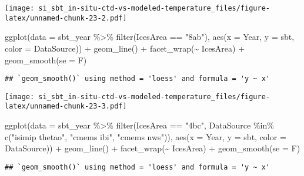 \documentclass[
]{article}
\newenvironment{Shaded}{\begin{snugshade}}{\end{snugshade}}
\newcommand{\AttributeTok}[1]{\textcolor[rgb]{0.77,0.63,0.00}{#1}}
\newcommand{\FunctionTok}[1]{\textcolor[rgb]{0.00,0.00,0.00}{#1}}
\newcommand{\NormalTok}[1]{#1}
\newcommand{\SpecialCharTok}[1]{\textcolor[rgb]{0.00,0.00,0.00}{#1}}
\newcommand{\StringTok}[1]{\textcolor[rgb]{0.31,0.60,0.02}{#1}}
\begin{document}
\texttt{[image: si\_sbt\_in-situ-ctd-vs-modeled-temperature\_files/figure-latex/unnamed-chunk-23-2.pdf]}

\begin{Shaded}
\begin{Highlighting}[]
\FunctionTok{ggplot}\NormalTok{(}\AttributeTok{data =}\NormalTok{ sbt\_year }\SpecialCharTok{\%\textgreater{}\%} \FunctionTok{filter}\NormalTok{(IcesArea }\SpecialCharTok{==} \StringTok{"8ab"}\NormalTok{), }\FunctionTok{aes}\NormalTok{(}\AttributeTok{x =}\NormalTok{ Year, }\AttributeTok{y =}\NormalTok{ sbt, }\AttributeTok{color =}\NormalTok{ DataSource)) }\SpecialCharTok{+} \FunctionTok{geom\_line}\NormalTok{() }\SpecialCharTok{+} \FunctionTok{facet\_wrap}\NormalTok{(}\SpecialCharTok{\textasciitilde{}}\NormalTok{ IcesArea) }\SpecialCharTok{+} \FunctionTok{geom\_smooth}\NormalTok{(}\AttributeTok{se =}\NormalTok{ F)}
\end{Highlighting}
\end{Shaded}

\begin{verbatim}
## `geom_smooth()` using method = 'loess' and formula = 'y ~ x'
\end{verbatim}

\texttt{[image: si\_sbt\_in-situ-ctd-vs-modeled-temperature\_files/figure-latex/unnamed-chunk-23-3.pdf]}

\begin{Shaded}
\begin{Highlighting}[]
\FunctionTok{ggplot}\NormalTok{(}\AttributeTok{data =}\NormalTok{ sbt\_year }\SpecialCharTok{\%\textgreater{}\%} \FunctionTok{filter}\NormalTok{(IcesArea }\SpecialCharTok{==} \StringTok{"4bc"}\NormalTok{, DataSource }\SpecialCharTok{\%in\%} \FunctionTok{c}\NormalTok{(}\StringTok{"isimip thetao"}\NormalTok{, }\StringTok{"cmems ibi"}\NormalTok{, }\StringTok{"cmems nws"}\NormalTok{)), }\FunctionTok{aes}\NormalTok{(}\AttributeTok{x =}\NormalTok{ Year, }\AttributeTok{y =}\NormalTok{ sbt, }\AttributeTok{color =}\NormalTok{ DataSource)) }\SpecialCharTok{+} \FunctionTok{geom\_line}\NormalTok{() }\SpecialCharTok{+} \FunctionTok{facet\_wrap}\NormalTok{(}\SpecialCharTok{\textasciitilde{}}\NormalTok{ IcesArea) }\SpecialCharTok{+} \FunctionTok{geom\_smooth}\NormalTok{(}\AttributeTok{se =}\NormalTok{ F)}
\end{Highlighting}
\end{Shaded}

\begin{verbatim}
## `geom_smooth()` using method = 'loess' and formula = 'y ~ x'
\end{verbatim}
\end{document}
